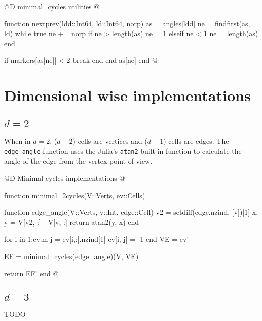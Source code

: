 \documentclass[10pt]{book}
\begin{document}
@D minimal\_cycles utilities
@{function nextprev(ldd::Int64, ld::Int64, norp)
    as = angles[ldd]
    ne = findfirst(as, ld)
    while true
        ne += norp
        if ne > length(as)
            ne = 1
        elseif ne < 1
            ne = length(as)
        end

        if markers[as[ne]] < 2
            break
        end
    end
    as[ne]
end
@}



\section{Dimensional wise implementations}
\label{sec:angles_fn}

\subsection{$d=2$}

When in $d=2$, ($d-2$)-cells are vertices and ($d-1$)-cells are edges.
The \texttt{edge\_angle} function uses the Julia's \texttt{atan2} 
built-in function to calculate the angle of the edge from the vertex point of view.

@D Minimal cycles implementations
@{function minimal_2cycles(V::Verts, ev::Cells)

    function edge_angle(V::Verts, v::Int, edge::Cell)
        v2 = setdiff(edge.nzind, [v])[1]
        x, y = V[v2, :] - V[v, :]
        return atan2(y, x)
    end

    for i in 1:ev.m
        j = ev[i,:].nzind[1]
        ev[i, j] = -1
    end
    VE = ev'

    EF = minimal_cycles(edge_angle)(V, VE)

    return EF'
end
@}

\subsection{$d=3$}

TODO


\backmatter


{}

\end{document}
